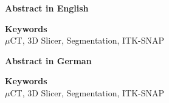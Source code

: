 
\newcommand*{\AbstractHead}[1]{%
{\noindent\color{header-blue}\Large\textbf{#1}}
\vspace{10pt}\\
}%

\newcommand*{\SomeSpace}{%
\vspace{\baselineskip}
}

\AbstractHead{Abstract in English}
\noindent
\normalsize
\lipsum[1]

\SomeSpace
\AbstractHead{Keywords}
\label{s:Keywords}
\normalsize
\noindent
$\mu$CT, 3D Slicer, Segmentation, ITK-SNAP

\glsresetall
\SomeSpace

\AbstractHead{Abstract in German}
\noindent
\normalsize
\lipsum[1]

\SomeSpace
\AbstractHead{Keywords}
\normalsize
\noindent
$\mu$CT, 3D Slicer, Segmentation, ITK-SNAP

\glsresetall
